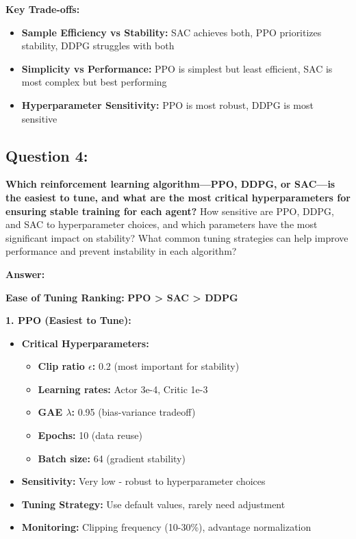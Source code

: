 \documentclass[12pt]{article}
\begin{document}
{{{\textbf{Key Trade-offs:}
\begin{itemize}
    \item \textbf{Sample Efficiency vs Stability:} SAC achieves both, PPO prioritizes stability, DDPG struggles with both
    \item \textbf{Simplicity vs Performance:} PPO is simplest but least efficient, SAC is most complex but best performing
    \item \textbf{Hyperparameter Sensitivity:} PPO is most robust, DDPG is most sensitive
\end{itemize}

\subsection{Question 4:}
\textbf{Which reinforcement learning algorithm—PPO, DDPG, or SAC—is the easiest to tune, and what are the most critical hyperparameters for ensuring stable training for each agent?}
\newline
How sensitive are PPO, DDPG, and SAC to hyperparameter choices, and which parameters have the most significant impact on stability?
What common tuning strategies can help improve performance and prevent instability in each algorithm?

\textbf{Answer:}

\textbf{Ease of Tuning Ranking:} \textbf{PPO > SAC > DDPG}

\textbf{1. PPO (Easiest to Tune):}
\begin{itemize}
    \item \textbf{Critical Hyperparameters:}
    \begin{itemize}
        \item \textbf{Clip ratio $\epsilon$:} 0.2 (most important for stability)
        \item \textbf{Learning rates:} Actor 3e-4, Critic 1e-3
        \item \textbf{GAE $\lambda$:} 0.95 (bias-variance tradeoff)
        \item \textbf{Epochs:} 10 (data reuse)
        \item \textbf{Batch size:} 64 (gradient stability)
    \end{itemize}
    \item \textbf{Sensitivity:} Very low - robust to hyperparameter choices
    \item \textbf{Tuning Strategy:} Use default values, rarely need adjustment
    \item \textbf{Monitoring:} Clipping frequency (10-30\%), advantage normalization
\end{itemize}

}}}
\end{document}
